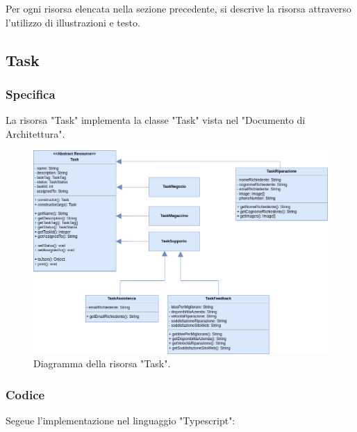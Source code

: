 \documentclass{report}
\begin{document}
Per ogni risorsa elencata nella sezione precedente, si descrive la risorsa attraverso l'utilizzo di illustrazioni e testo.

\subsection{Task}
\subsubsection*{Specifica}

La risorsa "Task" implementa la classe "Task" vista nel "Documento di Architettura".

\begin{figure}[H]
	\centering\includegraphics[width=1\textwidth]{images/resource_task.png}
	Diagramma della risorsa "Task".
\end{figure}

\subsubsection*{Codice}

Segeue l'implementazione nel linguaggio "Typescript":
\end{document}
